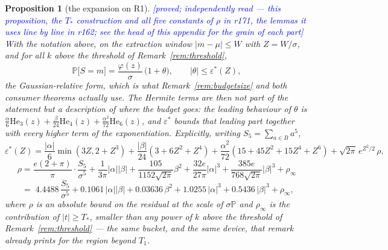 \documentclass[11pt,a4paper]{article}
\theoremstyle{plain}
\newtheorem{proposition}[theorem]{Proposition}
\theoremstyle{definition}
\theoremstyle{remark}
\newcommand{\STATUS}[1]{\textcolor{blue}{\textsf{[#1]}}}
\begin{document}
\begin{proposition}[the expansion on R1]\label{prop:R1done}
\STATUS{proved; independently read --- this proposition, the $T_{*}$ construction and all
five constants of $\rho$ in r171, the lemmas it uses line by line in r162; see the head of this
appendix for the grain of each part}
With the notation above, on the extraction window $|m-\mu|\le W$ with $Z=W/\sigma$, and for
all $k$ above the threshold of Remark~\ref{rem:threshold},
\[
  \mathbb{P}\bigl[S=m\bigr]=\frac{\varphi(z)}{\sigma}\,\bigl(1+\theta\bigr),
  \qquad |\theta|\le\varepsilon^{*}(Z),
\]
\emph{the Gaussian-relative form}, which is what Remark~\ref{rem:budgetsize} and both consumer
theorems actually use. The Hermite terms are then not part of the statement but a description
of where the budget goes: the leading behaviour of $\theta$ is
$\tfrac{\alpha}{6}\mathrm{He}_3(z)+\tfrac{\beta}{24}\mathrm{He}_4(z)
+\tfrac{\alpha^{2}}{72}\mathrm{He}_6(z)$, and $\varepsilon^{*}$ bounds that leading part
together with \emph{every} higher term of the exponentiation. Explicitly, writing
$S_5=\sum_{a\in B}a^{5}$,
\[
  \varepsilon^{*}(Z)=\frac{|\alpha|}{6}\min(3Z,2+Z^{3})
   +\frac{|\beta|}{24}(3+6Z^{2}+Z^{4})
   +\frac{\alpha^{2}}{72}(15+45Z^{2}+15Z^{4}+Z^{6})
   +\sqrt{2\pi}\,e^{Z^{2}/2}\,\rho ,
\]
\[
  \rho=\frac{e(2+\pi)}{\pi}\cdot\frac{S_5}{\sigma^{5}}
      +\frac{1}{3\pi}|\alpha||\beta|
      +\frac{105}{1152\sqrt{2\pi}}\beta^{2}
      +\frac{32e}{27\pi}|\alpha|^{3}
      +\frac{385e}{768\sqrt{2\pi}}|\beta|^{3}
      +\rho_{\infty}
\]
\[
  \;=\;4.4488\,\frac{S_5}{\sigma^{5}}+0.1061\,|\alpha||\beta|+0.03636\,\beta^{2}
      +1.0255\,|\alpha|^{3}+0.5436\,|\beta|^{3}+\rho_{\infty},
\]
where $\rho$ is an \emph{absolute} bound on the residual at the scale of $\sigma\mathbb{P}$ and
$\rho_{\infty}$ is the contribution of $|t|\ge T_{*}$, smaller than any power of $k$ above the
threshold of Remark~\ref{rem:threshold} --- the same bucket, and the same device, that remark
already prints for the region beyond $T_1$.


\end{proposition}
\end{document}
